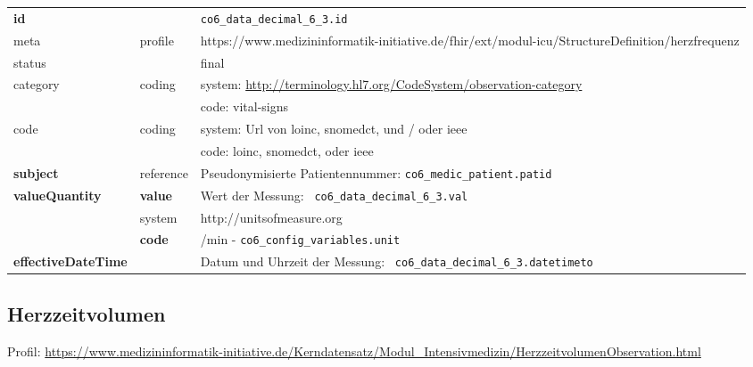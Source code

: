 \begin{longtable}{|l|l|p{7.5cm}|}
        \hline
        \rowcolor{lightgray} \multicolumn{3}{|l|}{Data Mapping (inhaltlich)} \\ \hline
        \textbf{id} &  & \texttt{co6\_data\_decimal\_6\_3.id} \\ \hline
	meta & profile & https://www.medizininformatik-initiative.de/fhir/ext/modul-icu/StructureDefinition/herzfrequenz \\ \hline 
	status &  & final   \\ \hline 
	category & coding & system: \url{http://terminology.hl7.org/CodeSystem/observation-category} \\
\cline{3-3}
	& & code: vital-signs\\ \hline
	code & coding & system: Url von \ac{loinc}, \ac{snomedct}, und / oder \ac{ieee} \\ 
	\cline{3-3} 
	 &  & code: \ac{loinc}, \ac{snomedct}, oder \ac{ieee} \\ \hline
	 \textbf{subject}  & reference & Pseudonymisierte Patientennummer: \texttt{co6\_medic\_patient.patid} \\ \hline
	 \textbf{valueQuantity}  & \textbf{value} & Wert der Messung: \texttt{
co6\_data\_decimal\_6\_3.val} \\
        \cline{2-3}
         & system & http://unitsofmeasure.org \\
         \cline{2-3}
         & \textbf{code} & /min - \texttt{co6\_config\_variables.unit} \\ \hline
     \textbf{effectiveDateTime}  & & Datum und Uhrzeit der Messung: \texttt{
co6\_data\_decimal\_6\_3.datetimeto} \\ \hline
\end{longtable}

\subsection{Herzzeitvolumen} 

Profil: \url{https://www.medizininformatik-initiative.de/Kerndatensatz/Modul_Intensivmedizin/HerzzeitvolumenObservation.html}

